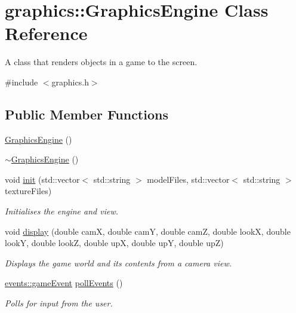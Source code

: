 \hypertarget{classgraphics_1_1_graphics_engine}{}\section{graphics\+:\+:Graphics\+Engine Class Reference}
\label{classgraphics_1_1_graphics_engine}


A class that renders objects in a game to the screen.  




{\ttfamily \#include $<$graphics.\+h$>$}

\subsection*{Public Member Functions}
\begin{DoxyCompactItemize}
\item 
\hyperlink{classgraphics_1_1_graphics_engine_aeeb84a8028c8301bc4702430447024ed}{Graphics\+Engine} ()
\item 
\hyperlink{classgraphics_1_1_graphics_engine_ab67afeefbc9f1c284f6ce310c31ae8f6}{$\sim$\+Graphics\+Engine} ()
\item 
void \hyperlink{classgraphics_1_1_graphics_engine_a021c411d51dc4dbf05c9abdfdb0468e1}{init} (std\+::vector$<$ std\+::string $>$ model\+Files, std\+::vector$<$ std\+::string $>$ texture\+Files)
\begin{DoxyCompactList}\small\item\em Initialises the engine and view. \end{DoxyCompactList}\item 
void \hyperlink{classgraphics_1_1_graphics_engine_ae4590b93ed39773136edb4b27b141815}{display} (double cam\+X, double cam\+Y, double cam\+Z, double look\+X, double look\+Y, double look\+Z, double up\+X, double up\+Y, double up\+Z)
\begin{DoxyCompactList}\small\item\em Displays the game world and its contents from a camera view. \end{DoxyCompactList}\item 
\hyperlink{structevents_1_1game_event}{events\+::game\+Event} \hyperlink{classgraphics_1_1_graphics_engine_a724a408b67faaedf35c16468240ba8b8}{poll\+Events} ()
\begin{DoxyCompactList}\small\item\em Polls for input from the user. \end{DoxyCompactList}\item 

\end{DoxyCompactItemize}
